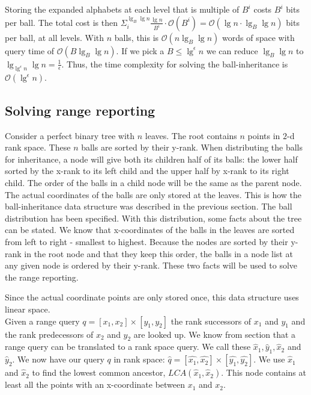 Storing the expanded alphabets at each level that is multiple of $B^i$ costs $B^i$ bits per ball. The total cost is then $\Sigma^{\lg_B \lg n}_i \frac{\lg n}{B^i} \cdot \mathcal{O}(B^i) = \mathcal{O}(\lg n \cdot \lg_B \lg n)$ bits per ball, at all levels. With $n$ balls, this is $\mathcal{O}(n \lg_B \lg n)$ words of space with query time of $\mathcal{O}(B \lg_B \lg n)$. If we pick a $B \leq \lg^\epsilon n$ we can reduce $\lg_B \lg n$ to $\lg_{\lg^\epsilon n} \lg n = \frac{1}{\epsilon}$. Thus, the time complexity for solving the ball-inheritance is $\mathcal{O}(\lg^\epsilon n)$. 



\subsection{Solving range reporting}

Consider a perfect binary tree with $n$ leaves. The root contains $n$ points in $2$-d rank space. These $n$ balls are sorted by their y-rank. When distributing the balls for inheritance, a node will give both its children half of its balls: the lower half sorted by the x-rank to its left child and the upper half by x-rank to its right child. The order of the balls in a child node will be the same as the parent node. The actual coordinates of the balls are only stored at the leaves. This is how the ball-inheritance data structure was described in the previous section. The ball distribution has been specified. With this distribution, some facts about the tree can be stated. We know that x-coordinates of the balls in the leaves are sorted from left to right - smallest to highest. Because the nodes are sorted by their y-rank in the root node and that they keep this order, the balls in a node list at any given node is ordered by their y-rank. These two facts will be used to solve the range reporting.

Since the actual coordinate points are only stored once, this data structure uses linear space. \\

Given a range query $q = [x_1, x_2] \times [y_1, y_2]$ the rank successors of $x_1$ and $y_1$ and the rank predecessors of $x_2$ and $y_2$ are looked up. We know from section  that a range query can be translated to a rank space query. We call these $\hat{x}_1, \hat{y}_1, \hat{x}_2$ and $\hat{y}_2$. We now have our query $q$ in rank space: $\hat{q} = [\hat{x_1}, \hat{x_2}] \times [\hat{y_1}, \hat{y_2}]$. We use $\hat{x}_1$ and $\hat{x}_2$ to find the lowest common ancestor, $LCA(\hat{x}_1, \hat{x}_2)$. This node contains at least all the points with an x-coordinate between $x_1$ and $x_2$. \\

